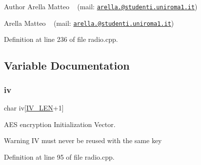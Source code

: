 \begin{DoxyAuthor}{Author}
Arella Matteo ~\newline
 (mail\+: \href{mailto:arella.1646983@studenti.uniroma1.it}{\tt arella.@studenti.\+uniroma1.\+it})

Arella Matteo ~\newline
 (mail\+: \href{mailto:arella.1646983@studenti.uniroma1.it}{\tt arella.@studenti.\+uniroma1.\+it}) 
\end{DoxyAuthor}


Definition at line 236 of file radio.\+cpp.



\subsection{Variable Documentation}
\mbox{\label{group___radio__module_ga352378cd7d5875f33dece696475cb8d4}} 
\subsubsection{\texorpdfstring{iv}{iv}}
{\footnotesize\ttfamily char iv\mbox{[}\mbox{\hyperlink{group___radio__module_ga35dc4d7d23c1b86227ceb68e6ebc4fc2}{I\+V\+\_\+\+L\+EN}}+1\mbox{]}}



A\+ES encryption Initialization Vector. 

\begin{DoxyWarning}{Warning}
IV must never be reused with the same key 
\end{DoxyWarning}


Definition at line 95 of file radio.\+cpp.


